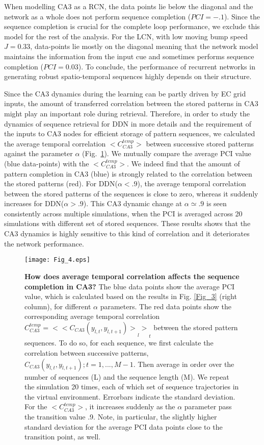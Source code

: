 \documentclass[utf8]{frontiersSCNS} %
\begin{document}
When modelling CA3 as a RCN, the data points lie below the diagonal and the network as a whole does not perform sequence completion ($PCI = -.1$).
%
Since the sequence completion is crucial for the complete loop performance, we exclude this model for the rest of the analysis.
%
For the LCN, with low moving bump speed $J = 0.33$, data-points lie mostly on the diagonal meaning that the network model maintains the information from the input cue and sometimes performs sequence completion ($PCI = 0.03$). 
%
To conclude, the performance of recurrent networks in generating robust spatio-temporal sequences highly depends on their structure. 


Since the CA3 dynamics during the learning can be partly driven by EC grid inputs, the amount of transferred correlation between the stored patterns in CA3 might play an important role during retrieval. 
Therefore, in order to study the dynamics of sequence retrieval for DDN in more details and the requirement of the inputs to CA3 nodes for efficient storage of pattern sequences, we calculated the average temporal correlation $ <C^{temp}_{CA3}>$ between successive stored patterns against the parameter $\alpha$ (Fig.~\ref{Fig_4}). 
%
We mutually compare the average PCI value (blue data-points) with the $ <C^{temp}_{CA3}>$.
%
We indeed find that the amount of pattern completion in CA3 (blue) is strongly related to the correlation between the stored patterns (red). 
For DDN($\alpha < .9$), the average temporal correlation between the stored patterns of the sequences is close to zero, whereas it suddenly increases for DDN($\alpha > .9$). 
%
This CA3 dynamic change at $\alpha \simeq .9$ is seen consistently across multiple simulations, when the PCI is averaged across 20 simulations with different set of stored sequences.   
%
These results shows that the CA3 dynamics is highly sensitive to this kind of correlation and it deteriorates the network performance.

\begin{figure}[!htb]
\centering\texttt{[image: Fig\_4.eps]}
\caption{\textbf{How does average temporal correlation affects the sequence completion in CA3?} 
The blue data points show the average PCI value, which is calculated based on the results in Fig. \ref{Fig_3} (right column), for different $\alpha$ parameters. The red data points show the corresponding average temporal correlation $C^{temp}_{CA3} = {<{<C_{CA3}(y_{l,t}, y_{l,t+1})>}_l>}_t$ between the stored pattern sequences. To do so, for each sequence, we first calculate the correlation between successive patterns, $C_{CA3}(y_{l,t}, y_{l,t+1}); t = 1, ..., M-1$. Then average in order over the number of sequences (L) and the sequence length (M). We repeat the simulation 20 times, each of which set of sequence trajectories in the virtual environment. Errorbars indicate the standard deviation. For the $<C^{temp}_{CA3} >$, it increases suddenly as the $\alpha$ parameter pass the transition value .9.
Note, in particular, the slightly higher standard deviation for the average PCI data points close to the transition point, as well.  
}
\label{Fig_4}
\end{figure}
\end{document}
